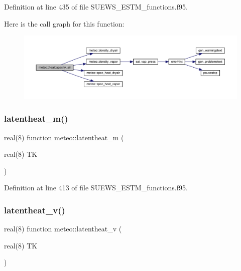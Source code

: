 Definition at line 435 of file S\+U\+E\+W\+S\+\_\+\+E\+S\+T\+M\+\_\+functions.\+f95.

Here is the call graph for this function\+:\nopagebreak
\begin{figure}[H]
\begin{center}
\leavevmode
\includegraphics[width=350pt]{namespacemeteo_a1c0a3877fc85ffd63bbf91b3e710b602_cgraph}
\end{center}
\end{figure}
\mbox{\label{namespacemeteo_a57634c251a493116d57d49865d95c7a6}} 
\subsubsection{\texorpdfstring{latentheat\+\_\+m()}{latentheat\_m()}}
{\footnotesize\ttfamily real(8) function meteo\+::latentheat\+\_\+m (\begin{DoxyParamCaption}\item[{real(8)}]{TK }\end{DoxyParamCaption})}



Definition at line 413 of file S\+U\+E\+W\+S\+\_\+\+E\+S\+T\+M\+\_\+functions.\+f95.

\mbox{\label{namespacemeteo_afaaf9cd39b3f9994813ea6197d3a74bf}} 
\subsubsection{\texorpdfstring{latentheat\+\_\+v()}{latentheat\_v()}}
{\footnotesize\ttfamily real(8) function meteo\+::latentheat\+\_\+v (\begin{DoxyParamCaption}\item[{real(8)}]{TK }\end{DoxyParamCaption})}



